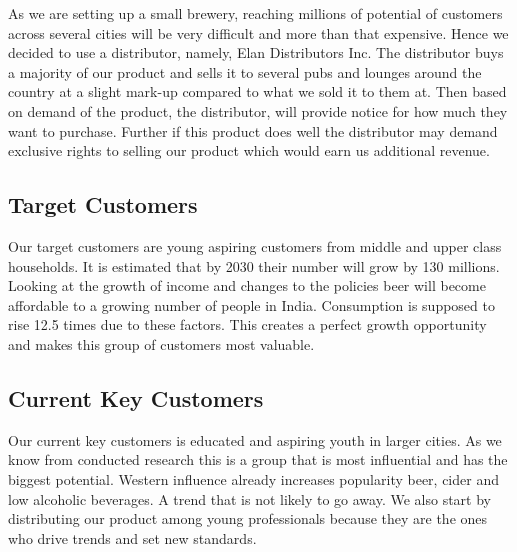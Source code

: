 \documentclass[11pt]{article}
\begin{document}
As we are setting up a small brewery, reaching millions of potential of customers across several cities will be very difficult and more than that expensive. Hence we decided to use a distributor, namely, Elan Distributors Inc. The distributor buys a majority of our product and sells it to several pubs and lounges around the country at a slight mark-up compared to what we sold it to them at. Then based on demand of the product, the distributor, will provide notice for how much they want to purchase. Further if this product does well the distributor may demand exclusive rights to selling our product which would earn us additional revenue.

  \subsection{Target Customers}
  Our target customers are young aspiring customers from middle and upper class households.
  It is estimated that by 2030 their number will grow by 130 millions.
  Looking at the growth of income and changes to the policies beer will become affordable to a growing number of people in India.
  Consumption is supposed to rise 12.5 times due to these factors.
  This creates a perfect growth opportunity and makes this group of customers most valuable.

  \subsection{Current Key Customers}
  Our current key customers is educated and aspiring youth in larger cities.
  As we know from conducted research this is a group that is most influential and has the biggest potential.
  Western influence already increases popularity beer, cider and low alcoholic beverages.
  A trend that is not likely to go away.
  We also start by distributing our product among young professionals because they are the ones who drive trends and set new standards.
\end{document}
